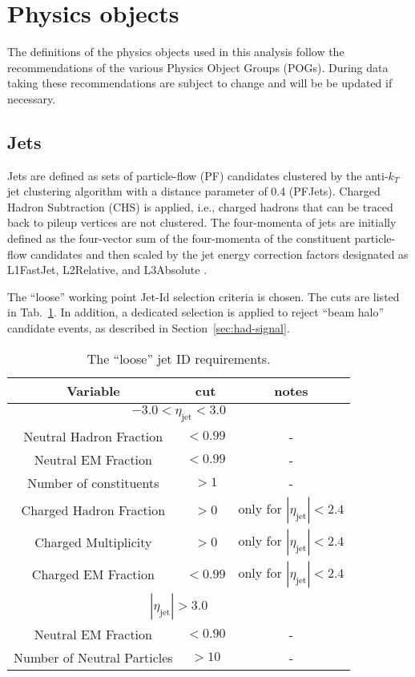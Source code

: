 \section{Physics objects}
\label{sec:objects}

The definitions of the physics objects used in this analysis follow
the recommendations of the various Physics Object Groups (POGs).
During data taking these recommendations are subject to change and
will be be updated if necessary.

\subsection{Jets}
\label{sec:jetreco}

Jets are defined as sets of particle-flow (PF) candidates clustered by
the anti-$k_{T}$ jet clustering algorithm \cite{Cacciari:2008gp} with
a distance parameter of 0.4 (PFJets). Charged Hadron Subtraction (CHS)
is applied, i.e., charged hadrons that can be traced back to pileup
vertices are not clustered.  The four-momenta of jets are initially
defined as the four-vector sum of the four-momenta of the constituent
particle-flow candidates and then scaled by the jet energy correction
factors designated as L1FastJet, L2Relative, and L3Absolute
\cite{Chatrchyan:2011ds}.

The ``loose'' working point Jet-Id selection criteria is chosen.  The
cuts are listed in Tab.~\ref{tab:loose-jet-id}.  In addition, a
dedicated selection is applied to reject ``beam halo'' candidate
events, as described in Section~\ref{sec:had-signal}.

\begin{table}[ht!]
  \caption{The ``loose'' jet ID requirements. \label{tab:loose-jet-id}}
  \centering
  \begin{tabular}{ ccc }
    \hline
    \hline
    Variable & cut & notes \\ \hline
    \multicolumn{3}{c}{$-3.0 < \eta_{\mathrm{jet}} < 3.0$} \\ \hline    
    Neutral Hadron Fraction & $<0.99$ & - \\
    Neutral EM Fraction & $<0.99$ & - \\
    Number of constituents & $>1$ & - \\
    Charged Hadron Fraction & $>0$ & only for $|\eta_{\mathrm{jet}}| < 2.4$ \\
    Charged Multiplicity & $>0$ & only for $|\eta_{\mathrm{jet}}| < 2.4$ \\
    Charged EM Fraction & $<0.99$ & only for $|\eta_{\mathrm{jet}}| < 2.4$ \\ \hline
    \multicolumn{3}{c}{$|\eta_{\mathrm{jet}}| > 3.0$} \\ \hline        
    Neutral EM Fraction & $<0.90$ & - \\
    Number of Neutral Particles & $>10$ & - \\
    \hline
    \hline
  \end{tabular}
\end{table}

